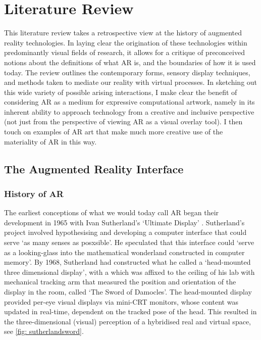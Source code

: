 \chapter{Literature Review}
\label{sec: literature}
\epigraph{\textit{}}{\citep[]{bilbow2022}}
This literature review takes a retrospective view at the history of augmented reality technologies. In laying clear the origination of these technologies within predominantly visual fields of research, it allows for a critique of preconceived notions about the definitions of what AR is, and the boundaries of how it is used today. The review outlines the contemporary forms, sensory display techniques, and methods taken to mediate our reality with virtual processes. In sketching out this wide variety of possible arising interactions, I make clear the benefit of considering AR as a medium for expressive computational artwork, namely in its inherent ability to approach technology from a creative and inclusive perspective (not just from the perspective of viewing AR as a visual overlay tool). I then touch on examples of AR art that make much more creative use of the materiality of AR in this way.



\section{The Augmented Reality Interface}\label{sec: literature-interface}
\subsection{History of AR}\label{sec: literature-interface-history}
The earliest conceptions of what we would today call AR began their development in 1965 with Ivan Sutherland's `Ultimate Display' \citeyearpar{sutherland1968}. Sutherland's project involved hypothesising and developing a computer interface that could serve `as many senses as posxsible'. He speculated that this interface could `serve as a looking-glass into the mathematical wonderland constructed in computer memory'. By 1968, Sutherland had constructed what he called a `head-mounted three dimensional display', with a which was affixed to the ceiling of his lab with mechanical tracking arm that measured the position and orientation of the display in the room, called `The Sword of Damocles'. The head-mounted display provided per-eye visual displays via mini-CRT monitors, whose content was updated in real-time, dependent on the tracked pose of the head. This resulted in the three-dimensional (visual) perception of a hybridised real and virtual space, see \autoref{fig: sutherlandsword}.

